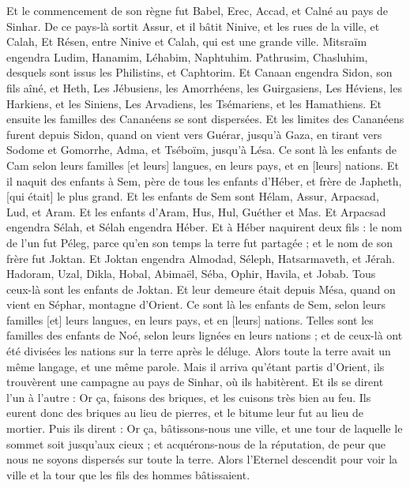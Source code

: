 \begin{multicols}{2}
Et le commencement de son règne fut Babel, Erec, Accad, et Calné au pays de Sinhar.
De ce pays-là sortit Assur, et il bâtit Ninive, et les rues de la ville, et Calah,
Et Résen, entre Ninive et Calah, qui est une grande ville.
Mitsraïm engendra Ludim, Hanamim, Léhabim, Naphtuhim.
Pathrusim, Chasluhim, desquels sont issus les Philistins, et Caphtorim.
Et Canaan engendra Sidon, son fils aîné, et Heth,
Les Jébusiens, les Amorrhéens, les Guirgasiens,
Les Héviens, les Harkiens, et les Siniens,
Les Arvadiens, les Tsémariens, et les Hamathiens. Et ensuite les familles des Cananéens se sont dispersées.
Et les limites des Cananéens furent depuis Sidon, quand on vient vers Guérar, jusqu'à Gaza, en tirant vers Sodome et Gomorrhe, Adma, et Tséboïm, jusqu'à Lésa.
Ce sont là les enfants de Cam selon leurs familles [et leurs] langues, en leurs pays, et en [leurs] nations.
Et il naquit des enfants à Sem, père de tous les enfants d'Héber, et frère de Japheth, [qui était] le plus grand.
Et les enfants de Sem sont Hélam, Assur, Arpacsad, Lud, et Aram.
Et les enfants d'Aram, Hus, Hul, Guéther et Mas.
Et Arpacsad engendra Sélah, et Sélah engendra Héber.
Et à Héber naquirent deux fils : le nom de l'un fut Péleg, parce qu'en son temps la terre fut partagée ; et le nom de son frère fut Joktan.
Et Joktan engendra Almodad, Séleph, Hatsarmaveth, et Jérah.
Hadoram, Uzal, Dikla,
Hobal, Abimaël, Séba,
Ophir, Havila, et Jobab. Tous ceux-là sont les enfants de Joktan.
Et leur demeure était depuis Mésa, quand on vient en Séphar, montagne d'Orient.
Ce sont là les enfants de Sem, selon leurs familles [et] leurs langues, en leurs pays, et en [leurs] nations.
Telles sont les familles des enfants de Noé, selon leurs lignées en leurs nations ; et de ceux-là ont été divisées les nations sur la terre après le déluge.
\VerseOne{}Alors toute la terre avait un même langage, et une même parole.
Mais il arriva qu'étant partis d'Orient, ils trouvèrent une campagne au pays de Sinhar, où ils habitèrent.
Et ils se dirent l'un à l'autre : Or ça, faisons des briques, et les cuisons très bien au feu. Ils eurent donc des briques au lieu de pierres, et le bitume leur fut au lieu de mortier.
Puis ils dirent : Or ça, bâtissons-nous une ville, et une tour de laquelle le sommet soit jusqu'aux cieux ; et acquérons-nous de la réputation, de peur que nous ne soyons dispersés sur toute la terre.
Alors l'Eternel descendit pour voir la ville et la tour que les fils des hommes bâtissaient.

\end{multicols}
